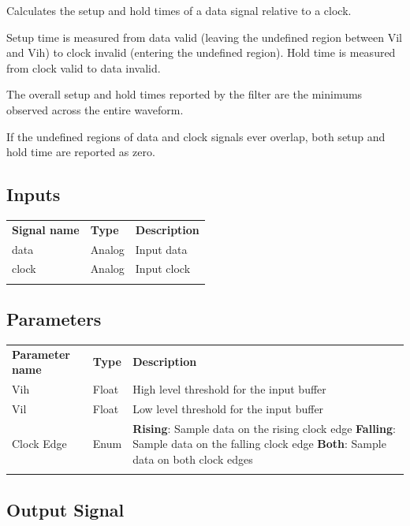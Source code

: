 Calculates the setup and hold times of a data signal relative to a clock.

Setup time is measured from data valid (leaving the undefined region between Vil and Vih) to clock invalid (entering
the undefined region). Hold time is measured from clock valid to data invalid.

The overall setup and hold times reported by the filter are the minimums observed across the entire waveform.

If the undefined regions of data and clock signals ever overlap, both setup and hold time are reported as zero.

\subsection{Inputs}

\begin{tabularx}{16cm}{llX}
\thickhline
\textbf{Signal name} & \textbf{Type} & \textbf{Description} \\
\thickhline
data & Analog & Input data \\
\thinhline
clock & Analog & Input clock \\
\thickhline
\end{tabularx}

\subsection{Parameters}

\begin{tabularx}{16cm}{llX}
\thickhline
\textbf{Parameter name} & \textbf{Type} & \textbf{Description} \\
\thickhline
Vih & Float & High level threshold for the input buffer\\
\thinhline
Vil & Float & Low level threshold for the input buffer\\
\thinhline
Clock Edge & Enum &
	\textbf{Rising}: Sample data on the rising clock edge \newline
	\textbf{Falling}: Sample data on the falling clock edge \newline
	\textbf{Both}: Sample data on both clock edges\\
\thickhline
\end{tabularx}

\subsection{Output Signal}

